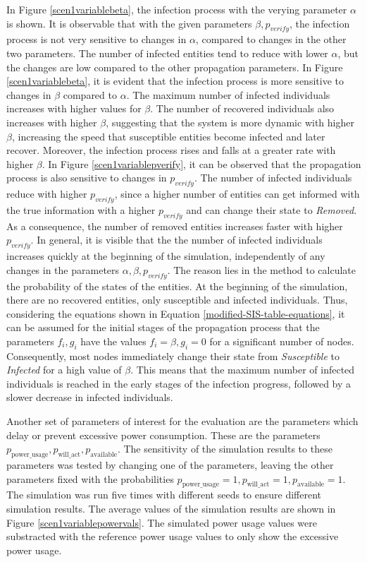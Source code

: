 In Figure \ref{scen1variablebeta}, the infection process with
the verying parameter $\alpha$ is shown. 
It is observable that with the given
parameters $\beta, p_{verify}$, the infection process is
not very sensitive to changes in $\alpha$, compared to changes 
in the other two parameters. The number of infected
entities tend to reduce with lower $\alpha$, but the changes
are low compared to the other propagation parameters.
In Figure \ref{scen1variablebeta}, it is evident that the
infection process is more sensitive to changes in 
$\beta$ compared to $\alpha$. The maximum number of infected 
individuals increases with higher values for $\beta$.
The number of recovered individuals also increases with higher
$\beta$, suggesting that the system is more dynamic with higher 
$\beta$, increasing the speed that susceptible entities
become infected and later recover. Moreover,
the infection process rises and falls at a greater rate with 
higher $\beta$. In Figure \ref{scen1variablepverify},
it can be observed that the propagation process is also 
sensitive to changes in $p_{verify}$. The number of infected 
individuals reduce with higher $p_{verify}$, since a higher
number of entities can get informed with the true information
with a higher $p_{verify}$ and can change their state to 
\textit{Removed}. As a consequence, the number of removed
entities increases faster with higher $p_{verify}$.
In general, it is visible that the the number of infected
individuals increases quickly at the beginning of 
the simulation, independently of any
changes in the parameters $\alpha, \beta, p_{verify}$. 
The reason lies in the method to 
calculate the probability of the states of the entities.
At the beginning of the simulation, there are no recovered
entities, only susceptible and infected individuals.
Thus, considering the equations shown in Equation 
\ref{modified-SIS-table-equations}, it can be assumed
for the initial stages of the propagation process
that the parameters $f_i, g_i$ have the values 
$f_i=\beta, g_i=0$ for a significant number of nodes. 
Consequently, most nodes immediately 
change their state from \textit{Susceptible} 
to \textit{Infected} for a high value of $\beta$.
This means that the maximum number of infected 
individuals is reached in the early stages of the 
infection progress, followed by a slower decrease
in infected individuals. 


Another set of parameters of interest for the evaluation
are the parameters which delay or prevent excessive
power consumption. These are the parameters $p_{\mathrm{power\_usage}},
p_{\mathrm{will\_act}}, p_{\mathrm{available}}$.
The sensitivity of the simulation results to these parameters
was tested by changing one of the parameters, leaving 
the other parameters fixed with the probabilities
$p_{\mathrm{power\_usage}}=1,
p_{\mathrm{will\_act}}=1, p_{\mathrm{available}}=1$.
The simulation was run five times with different seeds 
to ensure different simulation results. The 
average values of the simulation results are shown in 
Figure \ref{scen1variablepowervals}.
The simulated power usage values were substracted with the 
reference power 
usage values to only show the excessive power usage.

